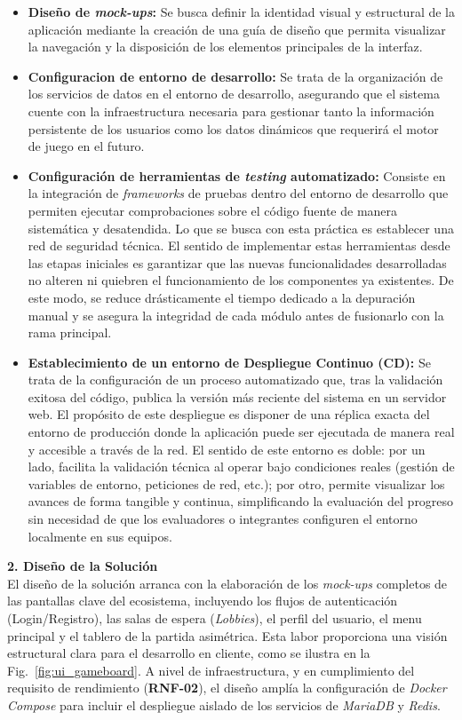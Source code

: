 \begin{itemize}
    \item \textbf{Diseño de \textit{mock-ups}:} Se busca definir la identidad visual y estructural de la aplicación mediante la creación de una guía de diseño que permita visualizar la navegación y la disposición de los elementos principales de la interfaz.

    \item \textbf{Configuracion de entorno de desarrollo:} Se trata de la organización de los servicios de datos en el entorno de desarrollo, asegurando que el sistema cuente con la infraestructura necesaria para gestionar tanto la información persistente de los usuarios como los datos dinámicos que requerirá el motor de juego en el futuro.

    \item \textbf{Configuración de herramientas de \textit{testing} automatizado:} Consiste en la integración de \textit{frameworks} de pruebas dentro del entorno de desarrollo que permiten ejecutar comprobaciones sobre el código fuente de manera sistemática y desatendida. Lo que se busca con esta práctica es establecer una red de seguridad técnica. El sentido de implementar estas herramientas desde las etapas iniciales es garantizar que las nuevas funcionalidades desarrolladas no alteren ni quiebren el funcionamiento de los componentes ya existentes. De este modo, se reduce drásticamente el tiempo dedicado a la depuración manual y se asegura la integridad de cada módulo antes de fusionarlo con la rama principal.

    \item \textbf{Establecimiento de un entorno de Despliegue Continuo (CD):} Se trata de la configuración de un proceso automatizado que, tras la validación exitosa del código, publica la versión más reciente del sistema en un servidor web. El propósito de este despliegue es disponer de una réplica exacta del entorno de producción donde la aplicación puede ser ejecutada de manera real y accesible a través de la red. El sentido de este entorno es doble: por un lado, facilita la validación técnica al operar bajo condiciones reales (gestión de variables de entorno, peticiones de red, etc.); por otro, permite visualizar los avances de forma tangible y continua, simplificando la evaluación del progreso sin necesidad de que los evaluadores o integrantes configuren el entorno localmente en sus equipos.
\end{itemize}

\textbf{2. Diseño de la Solución} \\
El diseño de la solución arranca con la elaboración de los \textit{mock-ups} completos de las pantallas clave del ecosistema, incluyendo los flujos de autenticación (Login/Registro), las salas de espera (\textit{Lobbies}), el perfil del usuario, el menu principal y el tablero de la partida asimétrica. Esta labor proporciona una visión estructural clara para el desarrollo en cliente, como se ilustra en la Fig.~\ref{fig:ui_gameboard}. A nivel de infraestructura, y en cumplimiento del requisito de rendimiento (\textbf{RNF-02}), el diseño amplía la configuración de \textit{Docker Compose} para incluir el despliegue aislado de los servicios de \textit{MariaDB} y \textit{Redis}.

